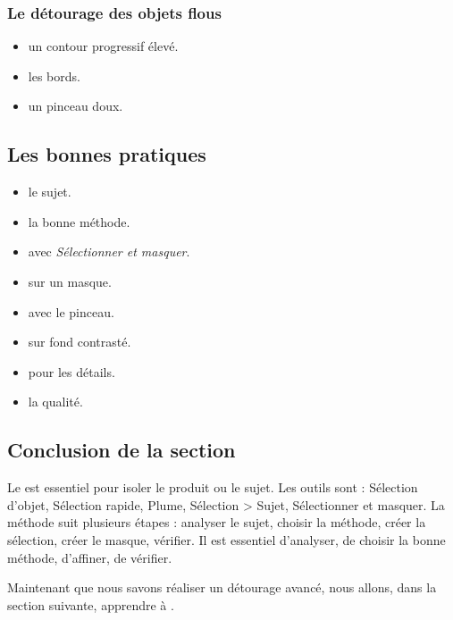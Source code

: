 \subsubsection{Le détourage des objets flous}

\begin{itemize}
    \item {} un contour progressif élevé.
    \item {} les bords.
    \item {} un pinceau doux.
\end{itemize}

\subsection{Les bonnes pratiques}

\begin{itemize}
    \item {} le sujet.
    \item {} la bonne méthode.
    \item {} avec \emph{Sélectionner et masquer}.
    \item {} sur un masque.
    \item {} avec le pinceau.
    \item {} sur fond contrasté.
    \item {} pour les détails.
    \item {} la qualité.
\end{itemize}

\subsection*{Conclusion de la section}

Le  est essentiel pour isoler le produit ou le sujet. Les outils sont : Sélection d'objet, Sélection rapide, Plume, Sélection > Sujet, Sélectionner et masquer. La méthode suit plusieurs étapes : analyser le sujet, choisir la méthode, créer la sélection, créer le masque, vérifier. Il est essentiel d'analyser, de choisir la bonne méthode, d'affiner, de vérifier.

Maintenant que nous savons réaliser un détourage avancé, nous allons, dans la section suivante, apprendre à .

